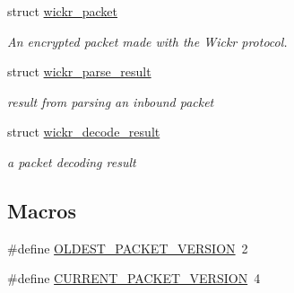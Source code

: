 \begin{DoxyCompactItemize}
struct \mbox{\hyperlink{structwickr__packet}{wickr\+\_\+packet}}
\begin{DoxyCompactList}\small\item\em An encrypted packet made with the Wickr protocol. \end{DoxyCompactList}\item 
struct \mbox{\hyperlink{structwickr__parse__result}{wickr\+\_\+parse\+\_\+result}}
\begin{DoxyCompactList}\small\item\em result from parsing an inbound packet \end{DoxyCompactList}\item 
struct \mbox{\hyperlink{structwickr__decode__result}{wickr\+\_\+decode\+\_\+result}}
\begin{DoxyCompactList}\small\item\em a packet decoding result \end{DoxyCompactList}\end{DoxyCompactItemize}
\subsection*{Macros}
\begin{DoxyCompactItemize}
\item 
\#define \mbox{\hyperlink{group__wickr__protocol_gad269883d0b8b26c4fa52da595ef5ddf7}{O\+L\+D\+E\+S\+T\+\_\+\+P\+A\+C\+K\+E\+T\+\_\+\+V\+E\+R\+S\+I\+ON}}~2
\item 
\#define \mbox{\hyperlink{group__wickr__protocol_ga89ff9f93c5494db53d3ff27353989862}{C\+U\+R\+R\+E\+N\+T\+\_\+\+P\+A\+C\+K\+E\+T\+\_\+\+V\+E\+R\+S\+I\+ON}}~4
\end{DoxyCompactItemize}
